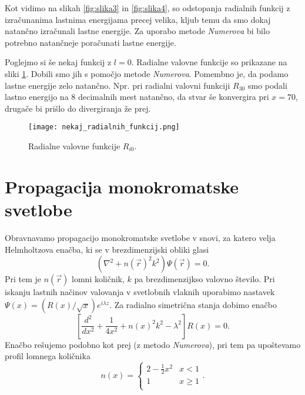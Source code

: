 \documentclass[12pt,a4paper]{article}
\begin{document}
Kot vidimo na slikah \ref{fig:slika3} in \ref{fig:slika4}, so odstopanja radialnih funkcij z izračunanima lastnima energijama precej velika, kljub temu da smo dokaj natančno izračunali lastne energije. Za uporabo metode \textit{Numerova} bi bilo potrebno natančneje poračunati lastne energije.

Poglejmo si še nekaj funkcij z $l=0$. Radialne valovne funkcije so prikazane na sliki \ref{fig:slika5}. Dobili smo jih s pomočjo metode \textit{Numerova}. Pomembno je, da podamo lastne energije zelo natančno. Npr. pri radialni valovni funkciji $R_{30}$ smo podali lastno energijo na 8 decimalnih mest natančno, da stvar še konvergira pri $x=70$, drugače bi prišlo do divergiranja že prej.

\begin{figure}[H]
    \centering
        \texttt{[image: nekaj\_radialnih\_funkcij.png]}
    \caption{Radialne valovne funkcije $R_{i0}$.} \label{fig:slika5}
\end{figure}


\section*{Propagacija monokromatske svetlobe}

Obravnavamo propagacijo monokromatske svetlobe v snovi, za katero velja Helmholtzova enačba, ki se v brezdimenzijski obliki glasi
\begin{equation}
(\nabla ^{2} + n(\vec{r})^{2} k^{2}) \Psi(\vec{r})=0. \nonumber
\end{equation}
Pri tem je $n(\vec{r})$ lomni količnik, $k$ pa brezdimenzijkso valovno število. Pri iskanju lastnih načinov valovanja v svetlobnih vlaknih uporabimo nastavek $\Psi(x)= (R(x)/\sqrt{x})e^{i\lambda z}$. Za radialno simetrična stanja dobimo enačbo
\begin{equation}
\left[ \frac{d^{2}}{dx^{2}} + \frac{1}{4x^{2}}+ n(x) ^{2} k^{2} -\lambda ^{2} \right] R(x)=0.
\end{equation}
Enačbo rešujemo podobno kot prej (z metodo \textit{Numerova}), pri tem pa upoštevamo profil lomnega količnika
\begin{equation}
n(x)= \begin{cases} 
      2 - \frac{1}{2}x^{2} & x < 1 \\
      1 &  x\geq 1 \\
   \end{cases}.
\end{equation}
\end{document}
